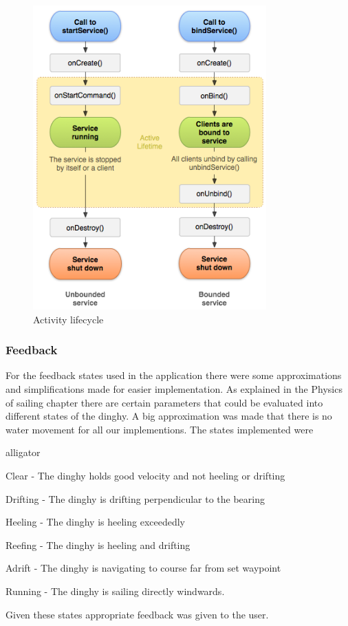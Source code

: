 \begin{figure}[H]
\centering
\includegraphics[width=0.8\textwidth]{Figures/service_lifecycle.png}
\caption{Activity lifecycle}
\label{android-service}
\end{figure}
\subsubsection{Feedback}
For the feedback states used in the application there were some approximations and simplifications made for easier implementation. As explained in the Physics of sailing chapter there are certain parameters that could be evaluated into different states of the dinghy. A big approximation was made that there is no water movement for all our implementions. The states implemented were
\begin{labeling}{alligator}
\item [Clear] - The dinghy holds good velocity and not heeling or drifting
\item [Drifting] - The dinghy is drifting perpendicular to the bearing
\item [Heeling] - The dinghy is heeling exceededly
\item [Reefing] - The dinghy is heeling and drifting
\item [Adrift] - The dinghy is navigating to course far from set waypoint
\item [Running] - The dinghy is sailing directly windwards.
\end{labeling}
Given these states appropriate feedback was given to the user.

